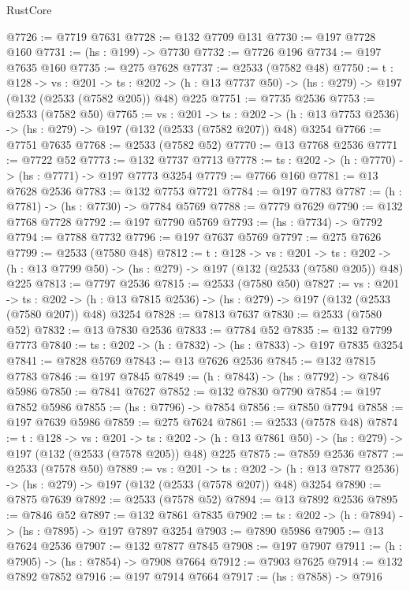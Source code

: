 \begin{lexlean}{RustCore}
\begin{coremodule}
@7726 := @7719 @7631
@7728 := @132 @7709 @131
@7730 := @197 @7728 @160
@7731 := (hs : @199) -> @7730
@7732 := @7726 @196
@7734 := @197 @7635 @160
@7735 := @275 @7628
@7737 := @2533 (@7582 @48)
@7750 := {t : @128} ->
  {vs : @201} ->
  {ts : @202} -> (h : @13 @7737 @50) -> (hs : @279) -> @197 (@132 (@2533 (@7582 @205)) @48) @225
@7751 := @7735 @2536
@7753 := @2533 (@7582 @50)
@7765 := {vs : @201} ->
  {ts : @202} -> (h : @13 @7753 @2536) -> (hs : @279) -> @197 (@132 (@2533 (@7582 @207)) @48) @3254
@7766 := @7751 @7635
@7768 := @2533 (@7582 @52)
@7770 := @13 @7768 @2536
@7771 := @7722 @52
@7773 := @132 @7737 @7713
@7778 := {ts : @202} -> (h : @7770) -> (hs : @7771) -> @197 @7773 @3254
@7779 := @7766 @160
@7781 := @13 @7628 @2536
@7783 := @132 @7753 @7721
@7784 := @197 @7783
@7787 := (h : @7781) -> (hs : @7730) -> @7784 @5769
@7788 := @7779 @7629
@7790 := @132 @7768 @7728
@7792 := @197 @7790 @5769
@7793 := (hs : @7734) -> @7792
@7794 := @7788 @7732
@7796 := @197 @7637 @5769
@7797 := @275 @7626
@7799 := @2533 (@7580 @48)
@7812 := {t : @128} ->
  {vs : @201} ->
  {ts : @202} -> (h : @13 @7799 @50) -> (hs : @279) -> @197 (@132 (@2533 (@7580 @205)) @48) @225
@7813 := @7797 @2536
@7815 := @2533 (@7580 @50)
@7827 := {vs : @201} ->
  {ts : @202} -> (h : @13 @7815 @2536) -> (hs : @279) -> @197 (@132 (@2533 (@7580 @207)) @48) @3254
@7828 := @7813 @7637
@7830 := @2533 (@7580 @52)
@7832 := @13 @7830 @2536
@7833 := @7784 @52
@7835 := @132 @7799 @7773
@7840 := {ts : @202} -> (h : @7832) -> (hs : @7833) -> @197 @7835 @3254
@7841 := @7828 @5769
@7843 := @13 @7626 @2536
@7845 := @132 @7815 @7783
@7846 := @197 @7845
@7849 := (h : @7843) -> (hs : @7792) -> @7846 @5986
@7850 := @7841 @7627
@7852 := @132 @7830 @7790
@7854 := @197 @7852 @5986
@7855 := (hs : @7796) -> @7854
@7856 := @7850 @7794
@7858 := @197 @7639 @5986
@7859 := @275 @7624
@7861 := @2533 (@7578 @48)
@7874 := {t : @128} ->
  {vs : @201} ->
  {ts : @202} -> (h : @13 @7861 @50) -> (hs : @279) -> @197 (@132 (@2533 (@7578 @205)) @48) @225
@7875 := @7859 @2536
@7877 := @2533 (@7578 @50)
@7889 := {vs : @201} ->
  {ts : @202} -> (h : @13 @7877 @2536) -> (hs : @279) -> @197 (@132 (@2533 (@7578 @207)) @48) @3254
@7890 := @7875 @7639
@7892 := @2533 (@7578 @52)
@7894 := @13 @7892 @2536
@7895 := @7846 @52
@7897 := @132 @7861 @7835
@7902 := {ts : @202} -> (h : @7894) -> (hs : @7895) -> @197 @7897 @3254
@7903 := @7890 @5986
@7905 := @13 @7624 @2536
@7907 := @132 @7877 @7845
@7908 := @197 @7907
@7911 := (h : @7905) -> (hs : @7854) -> @7908 @7664
@7912 := @7903 @7625
@7914 := @132 @7892 @7852
@7916 := @197 @7914 @7664
@7917 := (hs : @7858) -> @7916

\end{coremodule}
\end{lexlean}
